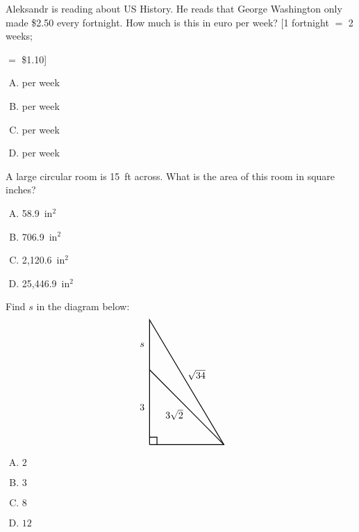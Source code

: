 \documentclass[12pt,letterpaper]{exam}
\begin{document}
\begin{questions}
\newpage



\question Aleksandr is reading about US History. He reads that George Washington only made \$2.50 every fortnight. How much is this in euro per week? [1 fortnight $=$ 2 weeks; \par {} $=$ \$1.10]
        \begin{enumerate}[A.]
        \item {} per week %
        \item {} per week
        \item {} per week
        \item {} per week 
        \end{enumerate}



\vfill



\question A large circular room is 15~ft across. What is the area of this room in square inches?
        \begin{enumerate}[A.]
        \item 58.9~in$^2$ %
        \item 706.9~in$^2$
        \item 2,120.6~in$^2$
        \item 25,446.9~in$^2$
        \end{enumerate}



\vfill



\question Find $s$ in the diagram below:
	\[
	\begin{tikzpicture}[scale=0.9]
	\draw[line width=0.03cm] (0,0) -- (0,5) -- (3,0) -- (0,0);
	\draw[line width=0.03cm] (0,0.3) -- (0.3,0.3) -- (0.3,0);
	\draw[line width=0.03cm] (3,0) -- (0,3);
	\node at (-0.3,1.5) {$3$};
	\node at (1.9,2.8) {$\sqrt{34}$};
	\node at (1,1.2) {$3\sqrt{2}$};
	\node at (-0.3,4.0) {$s$};
	\end{tikzpicture}
	\]

\begin{enumerate}[A.]
\item $2$
\item $3$
\item $8$ %
\item $12$
\end{enumerate}




\end{questions}
\end{document}
